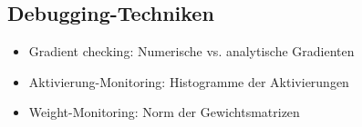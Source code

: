 ﻿\documentclass[12pt,a4paper]{article}
\begin{document}
\subsection*{Debugging-Techniken}
\begin{itemize}
    \item Gradient checking: Numerische vs. analytische Gradienten
    \item Aktivierung-Monitoring: Histogramme der Aktivierungen
    \item Weight-Monitoring: Norm der Gewichtsmatrizen
\end{itemize}
\end{document}
